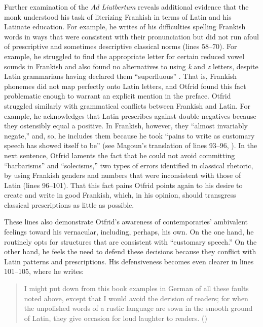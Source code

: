 Further examination of the \textit{Ad Liutbertum} reveals additional evidence that the monk understood his task of literizing Frankish in terms of Latin and his Latinate education. For example, he writes of his difficulties spelling Frankish words in ways that were consistent with their pronunciation but did not run afoul of prescriptive and sometimes descriptive classical norms (lines 58--70). For example, he struggled to find the appropriate letter for certain reduced vowel sounds in Frankish and also found no alternatives to using \textit{k} and \textit{z} letters, despite Latin grammarians having declared them “superfluous” \citep[880--881]{Magoun1943}. That is, Frankish phonemes did not map perfectly onto Latin letters, and Otfrid found this fact problematic enough to warrant an explicit mention in the preface. Otfrid struggled similarly with grammatical conflicts between Frankish and Latin. For example, he acknowledges that Latin prescribes against double negatives because they ostensibly equal a positive. In Frankish, however, they “almost invariably negate,” and, so, he includes them because he took “pains to write as customary speech has showed itself to be” (see Magoun’s translation of lines 93--96, \citealt[885]{Magoun1943}). In the next sentence, Otfrid laments the fact that he could not avoid committing “barbarisms” and “solecisms,” two types of errors identified in classical rhetoric, by using Frankish genders and numbers that were inconsistent with those of Latin (lines 96--101). That this fact pains Otfrid points again to his desire to create and write in good Frankish, which, in his opinion, should transgress classical prescriptions as little as possible.

  These lines also demonstrate Otfrid’s awareness of contemporaries’ ambivalent feelings toward his vernacular, including, perhaps, his own. On the one hand, he routinely opts for structures that are consistent with “customary speech.” On the other hand, he feels the need to defend these decisions because they conflict with Latin patterns and prescriptions. His defensiveness becomes even clearer in lines 101--105, where he writes:

\begin{quote}
I might put down from this book examples in German of all these faults noted above, except that I would avoid the derision of readers; for when the unpolished words of a rustic language are sown in the smooth ground of Latin, they give occasion for loud laughter to readers. (\citealt[886]{Magoun1943})
\end{quote}

